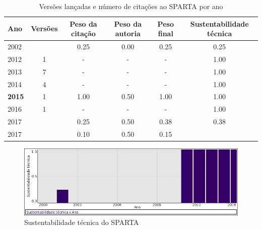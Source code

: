 \begin{table}[H]
\caption{Versões lançadas e número de citações ao SPARTA por ano}
\centering
\begin{tabular}{| l | c | c | c | c | c |}
  \hline
  Ano & Versões & Peso da citação & Peso da autoria & Peso final & Sustentabilidade técnica \\
  \hline
            2002
          &
          
          &
          0.25
          &
          0.00
          &
          0.25
          &
            {\color{red} 0.25}
          \\
\hline
        2012 & 1 & - & - & -
        &
          {\color{blue} 1.00}
        \\
\hline
        2013 & 7 & - & - & -
        &
          {\color{blue} 1.00}
        \\
\hline
        2014 & 4 & - & - & -
        &
          {\color{blue} 1.00}
        \\
\hline
            {\bf 2015}
          &
          1
          &
          1.00
          &
          0.50
          &
          1.00
          &
            {\color{blue} 1.00}
          \\
\hline
        2016 & 1 & - & - & -
        &
          {\color{blue} 1.00}
        \\
\hline
            2017
          &
          
          &
          0.25
          &
          0.50
          &
          0.38
          &
            {\color{red} 0.38}
          \\
            2017
          &
          
          &
          0.10
          &
          0.50
          &
          0.15
          &
          \\
\hline
\end{tabular}
\end{table}

\begin{figure}[h]
  \center
  \includegraphics[scale=0.50]{imagens/softwares-charts/sparta.png}
  \caption{Sustentabilidade técnica do SPARTA}
\end{figure}


